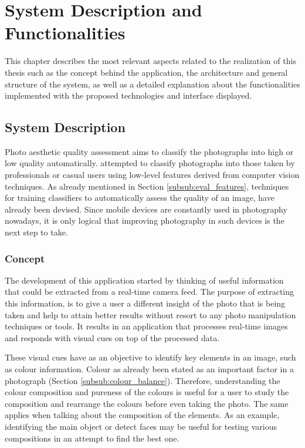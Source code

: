 
\chapter{System Description and Functionalities}
\label{cha:system}


This chapter describes the most relevant aspects related to the realization of this thesis such as the concept behind the application, the architecture and general structure of the system, as well as a detailed explanation about the functionalities implemented with the proposed technologies and interface displayed.

\section{System Description}
\label{sec:system_description}

Photo aesthetic quality assessment aims to classify the photographs into high or low quality automatically. \citeauthor{tong2005classification} \cite{tong2005classification} attempted to classify photographs into those taken by professionals or casual users using low-level features derived from computer vision techniques. As already mentioned in Section \ref{subsub:eval_features}, techniques for training classifiers to automatically assess the quality of an image, have already been devised. Since mobile devices are constantly used in photography nowadays, it is only logical that improving photography in such devices is the next step to take.

\subsection{Concept}
The development of this application started by thinking of useful information that could be extracted from a real-time camera feed. The purpose of extracting this information, is to give a user a different insight of the photo that is being taken and help to attain better results without resort to any photo manipulation techniques or tools. It results in an application that processes real-time images and responds with visual cues on top of the processed data.

These visual cues have as an objective to identify key elements in an image, such as colour information. Colour as already been stated as an important factor in a photograph (Section \ref{subsub:colour_balance}). Therefore, understanding the colour composition and pureness of the colours is useful for a user to study the composition and rearrange the colours before even taking the photo. The same applies when talking about the composition of the elements. As an example, identifying the main object or detect faces may be useful for testing various compositions in an attempt to find the best one.

